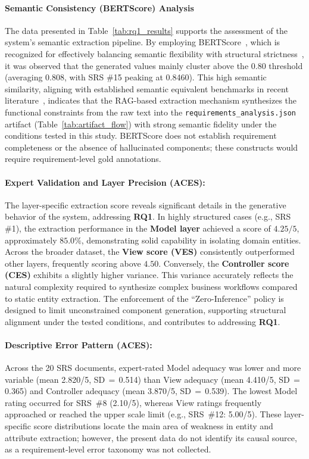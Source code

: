 \paragraph{Semantic Consistency (BERTScore) Analysis} 
The data presented in Table~\ref{tab:rq1_results} supports the assessment of the system’s semantic extraction pipeline. By employing BERTScore~\citep{zhang2019bertscore}, which is recognized for effectively balancing semantic flexibility with structural strictness~\citep{wang2025sted}, it was observed that the generated values mainly cluster above the 0.80 threshold (averaging 0.808, with SRS \#15 peaking at 0.8460). This high semantic similarity, aligning with established semantic equivalent benchmarks in recent literature~\citep[0.86--0.90]{wang2025sted}, indicates that the RAG-based extraction mechanism synthesizes the functional constraints from the raw text into the \texttt{requirements\_analysis.json} artifact (Table~\ref{tab:artifact_flow}) with strong semantic fidelity under the conditions tested in this study. BERTScore does not establish requirement completeness or the absence of hallucinated components; these constructs would require requirement-level gold annotations.

\paragraph{Expert Validation and Layer Precision (ACES):}
The layer-specific extraction score reveals significant details in the generative behavior of the system, addressing \textbf{RQ1}. In highly structured cases (e.g., SRS \#1), the extraction performance in the \textbf{Model layer} achieved a score of $4.25/5$, approximately $85.0\%$, demonstrating solid capability in isolating domain entities. Across the broader dataset, the \textbf{View score (VES)} consistently outperformed other layers, frequently scoring above $4.50$. Conversely, the \textbf{Controller score (CES)} exhibits a slightly higher variance. This variance accurately reflects the natural complexity required to synthesize complex business workflows compared to static entity extraction. The enforcement of the ``Zero-Inference'' policy is designed to limit unconstrained component generation, supporting structural alignment under the tested conditions, and contributes to addressing \textbf{RQ1}.

\paragraph{Descriptive Error Pattern (ACES):}
Across the 20 SRS documents, expert-rated Model adequacy was lower and more variable (mean 2.820/5, SD\,$=$\,0.514) than View adequacy (mean 4.410/5, SD\,$=$\,0.365) and Controller adequacy (mean 3.870/5, SD\,$=$\,0.539). The lowest Model rating occurred for SRS~\#8 (2.10/5), whereas View ratings frequently approached or reached the upper scale limit (e.g., SRS~\#12: 5.00/5). These layer-specific score distributions locate the main area of weakness in entity and attribute extraction; however, the present data do not identify its causal source, as a requirement-level error taxonomy was not collected.

